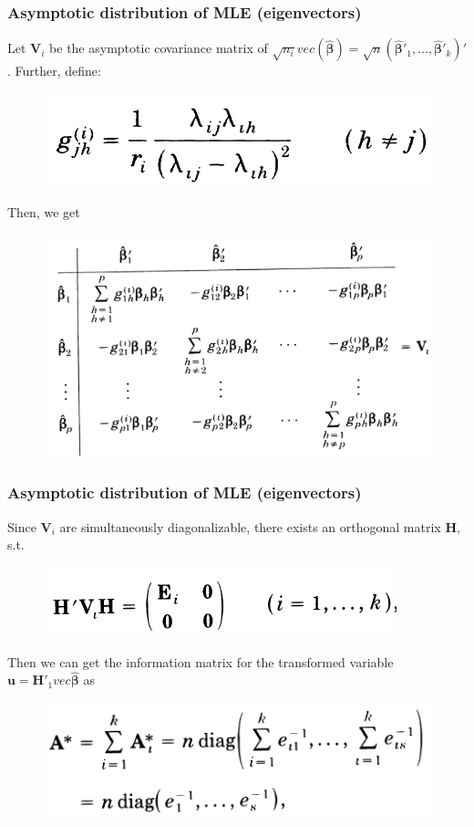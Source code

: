 \documentclass{beamer}
\begin{document}
\begin{frame}
	\frametitle{Asymptotic distribution of MLE (eigenvectors)}
	Let $\bm{V}_i$ be the asymptotic covariance matrix of $\sqrt{n_i}vec(\hat{\bm{\beta}}) = \sqrt{n}(\hat{\bm{\beta}}'_1,\ldots,\hat{\bm{\beta}}'_k)'$. Further, define:
	\begin{figure}
		\includegraphics[width=0.4\linewidth]{image005.png}
	\end{figure}
	Then, we get
	\begin{figure}
		\includegraphics[width=0.7\linewidth]{image006.png}
	\end{figure}
\end{frame}


\begin{frame}
	\frametitle{Asymptotic distribution of MLE (eigenvectors)}
	Since $\bm{V}_i$ are simultaneously diagonalizable, there exists an orthogonal matrix $\bm{H}$, s.t.
	\begin{figure}
		\includegraphics[width=0.5\linewidth]{image007.png}
	\end{figure}
Then we can get the information matrix for the transformed variable $\bm{u} = \bm{H}'_1 vec \hat{\bm{\beta}}$ as
\begin{figure}
	\includegraphics[width=0.5\linewidth]{image008.png}
\end{figure}
\end{frame}
\end{document}

